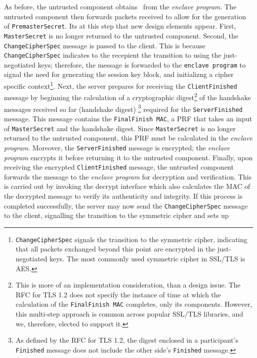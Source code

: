 \documentclass[../../main.tex]{subfiles}
\begin{document}
As before, the untrusted component obtains \srandom~from the
\textit{enclave program}. The untrusted component then forwards
packets received to allow for the generation of
\texttt{PremasterSecret}. Its at this step that new design elements
appear. First, \texttt{MasterSecret} is no longer returned to the
untrusted component. Second, the \texttt{Change\-CipherSpec} message
is passed to the client. This is because \texttt{ChangeCipherSpec}
indicates to the recepient the transition to using the just-negotiated
keys; therefore, the message is forwarded to the \texttt{enclave
  program} to signal the need for generating the session key block,
and initializng a cipher specific
context\footnote{\texttt{ChangeCipherSpec} signals the transition to
  the symmetric cipher, indicating that all packets exchanged beyond
  this point are encrypted in the just-negotiated keys. The most
  commonly used symmetric cipher in SSL/TLS is AES.}. Next, the server
prepares for receiving the \texttt{ClientFinished} message by
beginning the calculation of a cryptographic digest\footnote{This is
  more of an implementation consideration, than a design issue. The
  RFC for TLS 1.2 does not specify the instance of time at which the
  calculation of the \texttt{FinalFinish MAC} completes, only its
  components. However, this multi-step approach is common across
  popular SSL/TLS libraries, and we, therefore, elected to support
  it.} of the handshake messages received so far (handshake digest)
\footnote{As defined by the RFC for TLS 1.2, the digest enclosed in a
  participant's \texttt{Finished} message does not include the other
  side's \texttt{Finished} message.} required for the
\texttt{ServerFinished} message. This message contains the
\texttt{FinalFinish MAC}, a PRF that takes an input of
\texttt{MasterSecret} and the handshake digest. Since
\texttt{MasterSecret} is no longer returned to the untrusted
component, this PRF must be calculated in the \textit{enclave
  program}. Moreover, the \texttt{ServerFinished} message is
encrypted; the \textit{enclave program} encrypts it before returning
it to the untrusted component. Finally, upon receiving the encrypted
\texttt{ClientFinished} message, the untrusted component forwards the
message to the \textit{enclave program} for decryption and
verification. This is carried out by invoking the decrypt interface
which also calculates the MAC of the decrypted message to verify its
authenticity and integrity. If this process is completed successfully,
the server may now send the \texttt{ChangeCipherSpec} message to the
client, signalling the transition to the symmetric cipher and sets up
\end{document}
